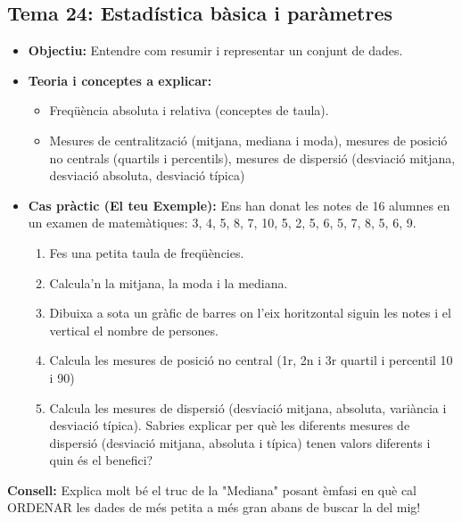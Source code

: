 \documentclass[12pt,a4paper]{article}
\begin{document}
\subsection*{Tema 24: Estadística bàsica i paràmetres}
\begin{itemize}[label=\textbullet]
    \item \textbf{Objectiu:} Entendre com resumir i representar un conjunt de dades.
    \item \textbf{Teoria i conceptes a explicar:}
        \begin{itemize}
            \item Freqüència absoluta i relativa (conceptes de taula).
            \item Mesures de centralització (mitjana, mediana i moda), mesures de posició no centrals (quartils i percentils), mesures de dispersió (desviació mitjana, desviació absoluta, desviació típica)
        \end{itemize}
    \item \textbf{Cas pràctic (El teu Exemple):} 
        Ens han donat les notes de 16 alumnes en un examen de matemàtiques: 3, 4, 5, 8, 7, 10, 5, 2, 5, 6, 5, 7, 8, 5, 6, 9. 
        \begin{enumerate}
            \item Fes una petita taula de freqüències.
            \item Calcula'n la mitjana, la moda i la mediana.
            \item Dibuixa a sota un gràfic de barres on l'eix horitzontal siguin les notes i el vertical el nombre de persones.
            \item Calcula les mesures de posició no central (1r, 2n i 3r quartil i percentil 10 i 90)
            \item Calcula les mesures de dispersió (desviació mitjana, absoluta, variància i desviació típica). Sabries explicar per què les diferents mesures de dispersió (desviació mitjana, absoluta i típica) tenen valors diferents i quin és el benefici?
        \end{enumerate}
\end{itemize}
\vfill
\noindent\textbf{Consell:} Explica molt bé el truc de la "Mediana" posant èmfasi en què cal ORDENAR les dades de més petita a més gran abans de buscar la del mig!
\end{document}
